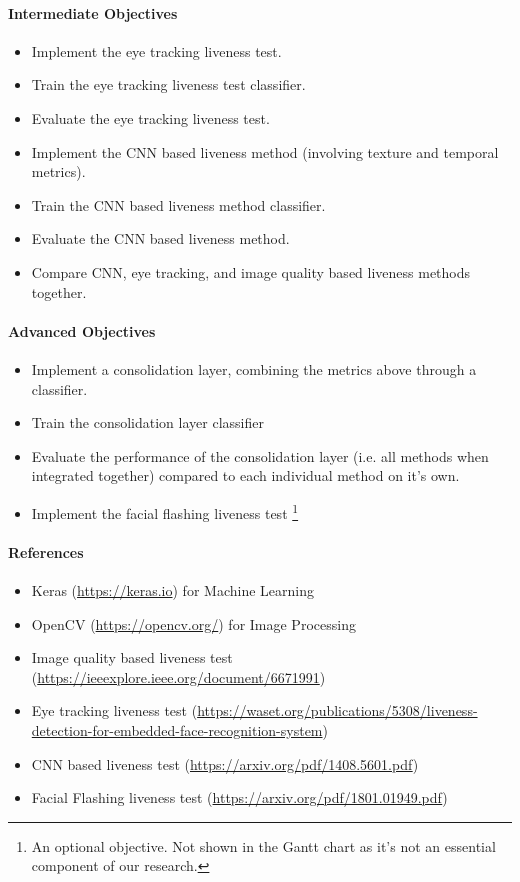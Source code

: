 \documentclass{article}
\begin{document}
    \paragraph{Intermediate Objectives}
        \begin{itemize}
            \item Implement the eye tracking liveness test.
            \item Train the eye tracking liveness test classifier.
            \item Evaluate the eye tracking liveness test.
            \item Implement the CNN based liveness method (involving texture and temporal metrics).
            \item Train the CNN based liveness method classifier.
            \item Evaluate the CNN based liveness method.
            \item Compare CNN, eye tracking, and image quality based liveness methods together.
        \end{itemize}
    \paragraph{Advanced Objectives}
        \begin{itemize}
            \item Implement a consolidation layer, combining the metrics above through a classifier.
            \item Train the consolidation layer classifier
            \item Evaluate the performance of the consolidation layer (i.e. all methods when integrated together) compared to each individual method on it's own.
            \item Implement the facial flashing liveness test \footnote{An optional objective. Not shown in the Gantt chart as it's not an essential component of our research.}
        \end{itemize}
    \paragraph{References}
        \begin{itemize}
            \item Keras (\url{https://keras.io}) for Machine Learning
            \item OpenCV (\url{https://opencv.org/}) for Image Processing
            \item Image quality based liveness test (\url{https://ieeexplore.ieee.org/document/6671991})
            \item Eye tracking liveness test (\url{https://waset.org/publications/5308/liveness-detection-for-embedded-face-recognition-system})
            \item CNN based liveness test (\url{https://arxiv.org/pdf/1408.5601.pdf})
            \item Facial Flashing liveness test (\url{https://arxiv.org/pdf/1801.01949.pdf})
        \end{itemize}
   
\end{document}
